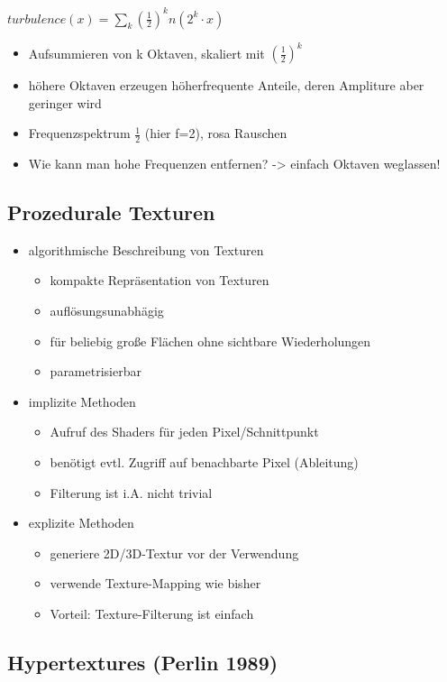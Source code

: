 \documentclass[paper=a4, fontsize=11pt]{scrartcl} %
\numberwithin{equation}{section} %
\numberwithin{figure}{section} %
\numberwithin{table}{section} %
\begin{document}
$turbulence(x) = \sum_k (\frac{1}{2})^k n(2^k \cdot x)$
\begin{itemize}
\item Aufsummieren von k Oktaven, skaliert mit $(\frac{1}{2})^k$
\item höhere Oktaven erzeugen höherfrequente Anteile, deren Ampliture aber geringer wird
\item Frequenzspektrum $\frac{1}{2}$ (hier f=2), \glqq rosa Rauschen\grqq
\item Wie kann man hohe Frequenzen entfernen? -> einfach Oktaven weglassen!
\end{itemize}

\subsection{Prozedurale Texturen}
\begin{itemize}
\item algorithmische Beschreibung von Texturen
\begin{itemize}
\item kompakte Repräsentation von Texturen
\item auflösungsunabhägig
\item für beliebig große Flächen ohne sichtbare Wiederholungen
\item parametrisierbar
\end{itemize}
\item implizite Methoden
\begin{itemize}
\item Aufruf des Shaders für jeden Pixel/Schnittpunkt
\item benötigt evtl. Zugriff auf benachbarte Pixel (Ableitung)
\item Filterung ist i.A. nicht trivial
\end{itemize}
\item explizite Methoden
\begin{itemize}
\item generiere 2D/3D-Textur vor der Verwendung
\item verwende Texture-Mapping wie bisher
\item Vorteil: Texture-Filterung ist einfach
\end{itemize}
\end{itemize}

\subsection{Hypertextures (Perlin 1989)}
\end{document}
